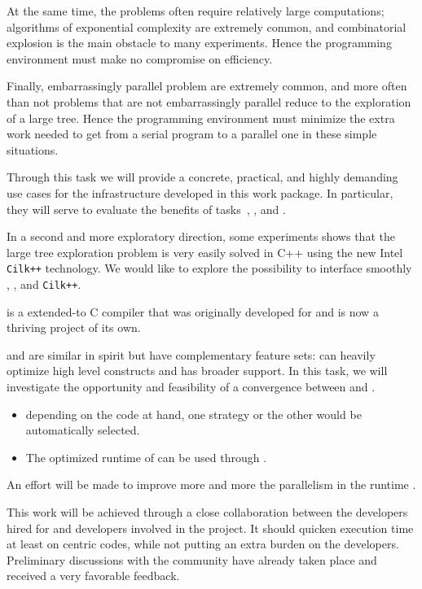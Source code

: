 \begin{workpackage}
\begin{tasklist}
\begin{task}[title=HPC infrastructure for combinatorics,id=hpc-combi,PM=4,lead=PS]
  At the same time, the problems often require relatively large
  computations; algorithms of exponential complexity are extremely
  common, and combinatorial explosion is the main obstacle to many
  experiments. Hence the programming environment must make no
  compromise on efficiency.

  Finally, embarrassingly parallel problem are extremely common, and
  more often than not problems that are not embarrassingly parallel
  reduce to the exploration of a large tree. Hence the programming
  environment must minimize the extra work needed to get from a serial
  program to a parallel one in these simple situations.

  Through this task we will provide a concrete, practical, and highly
  demanding use cases for the infrastructure developed in this work
  package. In particular, they will serve to evaluate the benefits of
  tasks~,
  , and
  .

  In a second and more exploratory direction, some experiments shows that the
  large tree exploration problem is very easily solved in C++ using the new
  Intel \texttt{Cilk++} technology. We would like to explore the possibility to
  interface smoothly \Pythran, \Cython, and \texttt{Cilk++}.
\end{task}

\begin{task}[title=Pythran,id=pythran,lead=UJF]
  \Cython is a extended-\Python to C compiler that was originally developed for
  \Sage and is now a thriving project of its own.

  \Pythran and \Cython are similar in spirit but have complementary feature
  sets: \Pythran can heavily optimize high level \Numpy constructs and \Cython
  has broader \Python support. In this task, we will investigate the
  opportunity and feasibility of a convergence between \Cython and \Pythran.
  \begin{itemize}
    \item depending on the code at hand, one strategy or the other would be automatically selected.
    \item The optimized runtime of \Pythran can be used through \Cython.
  \end{itemize}
  An effort will be made to improve more and more the parallelism in the
  \Pythran runtime .

  This work will be achieved through a close collaboration between the \Pythran
  developers hired for \TheProject and \Cython developers involved in the \Sage
  project. It should quicken \Sage execution time at least on \Numpy centric
  codes, while not putting an extra burden on the developers.  Preliminary
  discussions with the \Cython community have already taken place and received a
  very favorable feedback.


\end{task}
\end{tasklist}
\end{workpackage}
